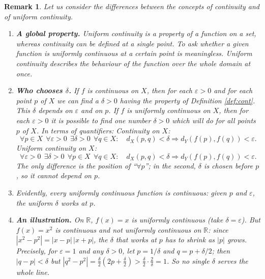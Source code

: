 \documentclass{article}
\theoremstyle{mythm}
\newtheorem{remark}[theorem]{Remark}
\begin{document}
\begin{remark}\label{rem:unifvscont}
Let us consider the differences between the concepts of continuity and of uniform continuity.
\begin{enumerate}
    \item \textbf{A global property.} Uniform continuity is a property of a function on a \textit{set}, whereas continuity can be defined at a single point. To ask whether a given function is uniformly continuous at a certain point is meaningless. Uniform continuity describes the behaviour of the function over the whole domain at once.

    \item \textbf{Who chooses $\delta$.} If $f$ is continuous on $X$, then for each $\varepsilon > 0$ and for each point $p$ of $X$ we can find a $\delta > 0$ having the property of Definition \ref{def:cont}. This $\delta$ depends on $\varepsilon$ \textit{and on $p$}. If $f$ is uniformly continuous on $X$, then for each $\varepsilon > 0$ it is possible to find \textit{one} number $\delta > 0$ which will do for \textit{all} points $p$ of $X$. In terms of quantifiers:
    Continuity on $X$:
    \[
    \forall p \in X\ \ \forall \varepsilon > 0\ \ \exists \delta > 0\ \ \forall q \in X: \quad d_X(p,q) < \delta \Rightarrow d_Y(f(p), f(q)) < \varepsilon.
    \]
    Uniform continuity on $X$:
    \[
    \forall \varepsilon > 0\ \ \exists \delta > 0\ \ \forall p \in X\ \ \forall q \in X: \quad d_X(p,q) < \delta \Rightarrow d_Y(f(p), f(q)) < \varepsilon.
    \]
    The only difference is the position of ``$\forall p$''; in the second, $\delta$ is chosen before $p$, so it cannot depend on $p$.

    \item Evidently, every uniformly continuous function is continuous: given $p$ and $\varepsilon$, the uniform $\delta$ works at $p$.

    \item \textbf{An illustration.} On $\mathbb{R}$, $f(x) = x$ is uniformly continuous (take $\delta = \varepsilon$). But $f(x) = x^2$ is continuous and not uniformly continuous on $\mathbb{R}$: since $|x^2 - p^2| = |x-p|\,|x+p|$, the $\delta$ that works at $p$ has to shrink as $|p|$ grows. Precisely, for $\varepsilon = 1$ and any $\delta > 0$, let $p = 1/\delta$ and $q = p + \delta/2$; then $|q - p| < \delta$ but $|q^2 - p^2| = \frac{\delta}{2}(2p + \frac{\delta}{2}) > \frac{\delta}{2} \cdot \frac{2}{\delta} = 1$. So no single $\delta$ serves the whole line.
\end{enumerate}
\end{remark}
\end{document}
